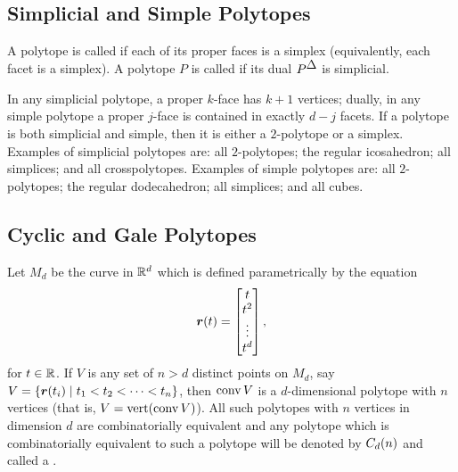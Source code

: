     \subsection{Simplicial and Simple Polytopes}

    A polytope is called  if each of its proper faces is a simplex (equivalently, each facet is a simplex).  A polytope \(P\) is called  if its dual \(P^{\tri}\) is simplicial.

    In any simplicial polytope, a proper \(k\)-face has \(k+1\) vertices; dually, in any simple polytope a proper \(j\)-face is contained in exactly \(d-j\) facets.  If a polytope is both simplicial and simple, then it is either a \(2\)-polytope or a simplex.  Examples of simplicial polytopes are: all \(2\)-polytopes; the regular icosahedron; all simplices; and all crosspolytopes.  Examples of simple polytopes are: all \(2\)-polytopes; the regular dodecahedron; all simplices; and all cubes.

    \subsection{Cyclic and Gale Polytopes}

    Let \(M_d\) be the curve in \(\R d\) which is defined parametrically by the equation
        \[
            \ve r(t)
                =   \begin{bmatrix}
                        t\\ t^2\\\vdots\\ t^d
                    \end{bmatrix},
        \]
    for \(t\in\RR\).  If \(V\) is any set of \(n>d\) distinct points on \(M_d\), say \(V=\setb{\ve r(t_i)}{t_1<t_2<\dotsb<t_n}\), then \(\conv V\) is a  \(d\)-dimensional polytope with \(n\) vertices (that is, \(V=\vrt(\conv V)\)).  All such polytopes with \(n\) vertices in dimension \(d\) are combinatorially equivalent and any polytope which is combinatorially equivalent to such a polytope will be denoted by \(\cyc nd\) and called a .

